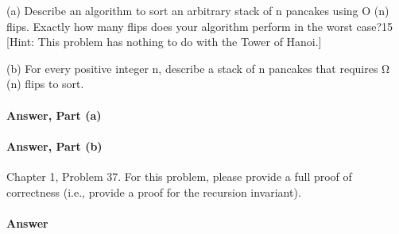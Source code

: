 \documentclass{article}
\begin{document}
(a) Describe an algorithm to sort an arbitrary stack of n pancakes using
O (n) flips. Exactly how many flips does your algorithm perform in the
worst case?15 [Hint: This problem has nothing to do with the Tower of
Hanoi.]

(b) For every positive integer n, describe a stack of n pancakes that requires
Ω (n) flips to sort.

\paragraph{Answer, Part (a)}

\todo{}

\paragraph{Answer, Part (b)}

\todo{}

\collab{\todo{}}

Chapter 1, Problem 37.  For this problem, please provide a full proof of
correctness (i.e., provide a proof for the recursion invariant).

\paragraph{Answer}
\todo{}
\end{document}

